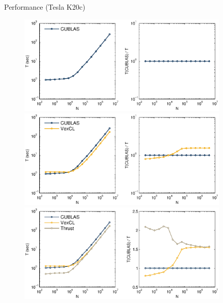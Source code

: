 \documentclass[@BEAMER_OPTIONS@]{beamer}
\begin{document}
\begin{frame}[fragile]{Performance (Tesla K20c)}
    \begin{figure}
         {\includegraphics[width=0.9\textwidth]{perfcmp-1}}%
         {\includegraphics[width=0.9\textwidth]{perfcmp-2}}%
         {\includegraphics[width=0.9\textwidth]{perfcmp-3}}%

\end{figure}
\end{frame}
\end{document}
